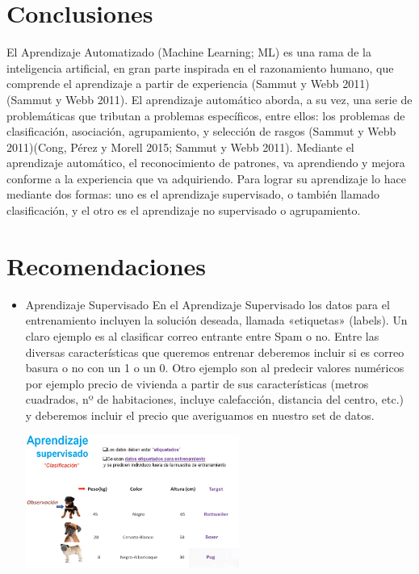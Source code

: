 \documentclass[twoside,twocolumn]{article}
\begin{document}


\section{Conclusiones}

El Aprendizaje Automatizado (Machine Learning; ML) es una rama de la inteligencia artificial, en gran parte inspirada en el razonamiento humano, que comprende el aprendizaje a partir de experiencia (Sammut y Webb 2011)(Sammut y Webb 2011). El aprendizaje automático aborda, a su vez, una serie de problemáticas que tributan a problemas específicos, entre ellos: los problemas de clasificación, asociación, agrupamiento, y selección de rasgos (Sammut y Webb 2011)(Cong, Pérez y Morell 2015; Sammut y Webb 2011).
Mediante el aprendizaje automático, el reconocimiento de patrones, va aprendiendo y mejora conforme a la experiencia que va adquiriendo. Para lograr su aprendizaje lo hace mediante dos formas: uno es el aprendizaje supervisado, o también llamado clasificación, y el otro es el aprendizaje no supervisado o agrupamiento.


\section{Recomendaciones}


\begin{itemize}
\item Aprendizaje Supervisado
En el Aprendizaje Supervisado los datos para el entrenamiento incluyen la solución deseada, llamada «etiquetas» (labels). Un claro ejemplo es al clasificar correo entrante entre Spam o no. Entre las diversas características que queremos entrenar deberemos incluir si es correo basura o no con un 1 o un 0. Otro ejemplo son al predecir valores numéricos por ejemplo precio de vivienda a partir de sus características (metros cuadrados, nº de habitaciones, incluye calefacción, distancia del centro, etc.) y deberemos incluir el precio que averiguamos en nuestro set de datos.

\includegraphics[width=7cm]{Imagenes/imagen1}

\end{itemize}
\end{document}
